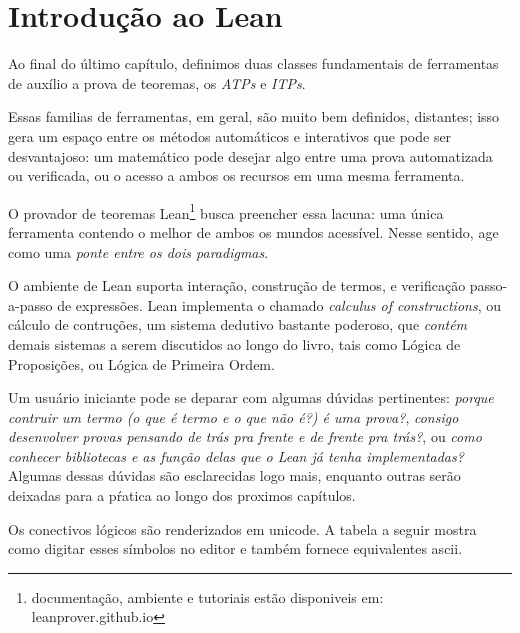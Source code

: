 \chapter{Introdução ao Lean }

Ao final do último capítulo, definimos duas classes fundamentais de ferramentas de auxílio a prova de teoremas, os \textit{ATPs} e \textit{ITPs}.

Essas familias de ferramentas, em geral, são muito bem definidos, distantes; isso gera um espaço entre os métodos automáticos e interativos que pode ser desvantajoso: um  matemático pode desejar algo entre uma prova automatizada ou verificada, ou o acesso a ambos os recursos em uma mesma ferramenta.

O provador de teoremas Lean\footnote{documentação, ambiente e tutoriais estão disponiveis em: leanprover.github.io} busca preencher essa lacuna: uma única ferramenta contendo o melhor de ambos os mundos acessível.
Nesse sentido, age como uma \textit{ponte entre os dois paradigmas}.


O ambiente de Lean suporta interação, construção de termos, e verificação passo-a-passo de expressões.
Lean implementa o chamado \textit{calculus of constructions}, ou cálculo de contruções, um sistema dedutivo bastante poderoso, que \textit{contém} demais sistemas a serem discutidos ao longo do livro, tais como Lógica de Proposições, ou Lógica de Primeira Ordem.

Um usuário iniciante pode se deparar com algumas dúvidas pertinentes: \textit{porque contruir um termo (o que é termo e o que não é?) é uma prova?}, \textit{consigo desenvolver provas pensando de trás pra frente e de frente pra trás?}, ou \textit{como conhecer bibliotecas e as função delas que o Lean já tenha implementadas?} Algumas dessas dúvidas são esclarecidas logo mais, enquanto outras serão deixadas para a pŕatica ao longo dos proximos capítulos.


Os conectivos lógicos são renderizados em unicode. 
A tabela a seguir mostra como digitar esses símbolos no editor e também fornece equivalentes ascii.

